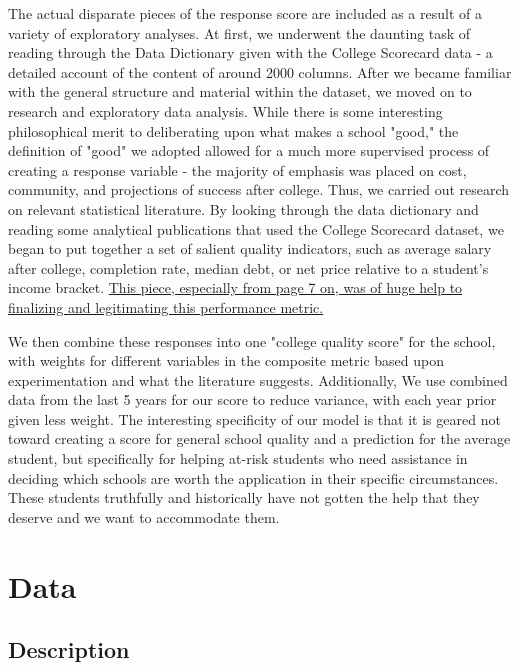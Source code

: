 \documentclass{article}\usepackage[]{graphicx}\usepackage[]{color}
\begin{document}
The actual disparate pieces of the response score are included as a result of a variety of exploratory analyses. At first, we underwent the daunting task of reading through the Data Dictionary given with the College Scorecard data - a detailed account of the content of around 2000 columns. After we became familiar with the general structure and material within the dataset, we moved on to research and exploratory data analysis. While there is some interesting philosophical merit to deliberating upon what makes a school "good," the definition of "good" we adopted allowed for a much more supervised process of creating a response variable - the majority of emphasis was placed on cost, community, and projections of success after college. Thus, we carried out research on relevant statistical literature. By looking through the data dictionary and reading some analytical publications that used the College Scorecard dataset, we began to put together a set of salient quality indicators, such as average salary after college, completion rate, median debt, or net price relative to a student's income bracket. \href{http://bit.ly/2gGW2fG}{This piece, especially from page 7 on, was of huge help to finalizing and legitimating this performance metric.}   

We then combine these responses into one "college quality score" for the school, with weights for different variables in the composite metric based upon experimentation and what the literature suggests. Additionally, We use combined data from the last 5 years for our score to reduce variance, with each year prior given less weight. The interesting specificity of our model is that it is geared not toward creating a score for general school quality and a prediction for the average student, but specifically for helping at-risk students who need assistance in deciding which schools are worth the application in their specific circumstances. These students truthfully and historically have not gotten the help that they deserve and we want to accommodate them.

\maketitle
\section{Data}



\subsection{Description}
\end{document}
